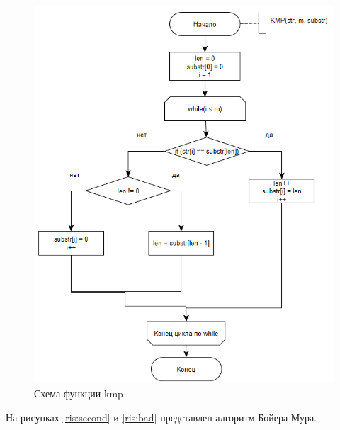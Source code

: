 \documentclass[12pt, a4paper]{report}
\begin{document}
	\begin{figure}[ht!]
		\centering
		\includegraphics[scale=1.2]{img/kmp.png}
		\caption{Схема функции kmp}
		\label{ris:kmp}
	\end{figure}\newpage
	
	На рисунках \ref{ris:second} и \ref{ris:bad} представлен алгоритм Бойера-Мура.
	
\end{document}
